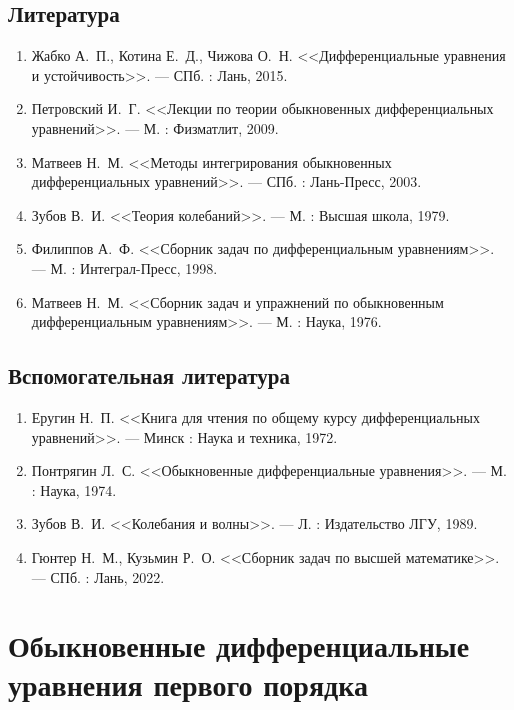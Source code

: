 \documentclass[12pt,a4paper]{report}
\begin{document}
\section*{Литература}
\begin{enumerate}
    \item Жабко А.\ П., Котина Е.\ Д., Чижова О.\ Н. <<Дифференциальные уравнения и устойчивость>>. --- СПб. : Лань, 2015.
    \item Петровский И.\ Г. <<Лекции по теории обыкновенных дифференциальных уравнений>>. --- М. : Физматлит, 2009.
    \item Матвеев Н.\ М. <<Методы интегрирования обыкновенных дифференциальных уравнений>>. --- СПб. : Лань-Пресс, 2003.
    \item Зубов В.\ И. <<Теория колебаний>>. --- М. : Высшая школа, 1979.
    \item Филиппов А.\ Ф. <<Сборник задач по дифференциальным уравнениям>>. --- М. : Интеграл-Пресс, 1998.
   \item Матвеев Н.\ М. <<Сборник задач и упражнений по обыкновенным дифференциальным уравнениям>>. --- М. : Наука, 1976.
\end{enumerate}
\section*{Вспомогательная литература}
\begin{enumerate}
    \item Еругин Н.\ П. <<Книга для чтения по общему курсу дифференциальных уравнений>>. --- Минск : Наука и техника, 1972.
    \item Понтрягин Л.\ С. <<Обыкновенные дифференциальные уравнения>>. --- М. : Наука, 1974.
    \item Зубов В.\ И. <<Колебания и волны>>. --- Л. : Издательство ЛГУ, 1989.
    \item Гюнтер Н.\ М., Кузьмин Р.\ О. <<Сборник задач по высшей математике>>. --- СПб. : Лань, 2022.
\end{enumerate}

\newpage

\chapter{Обыкновенные дифференциальные уравнения первого порядка}

\end{document}
